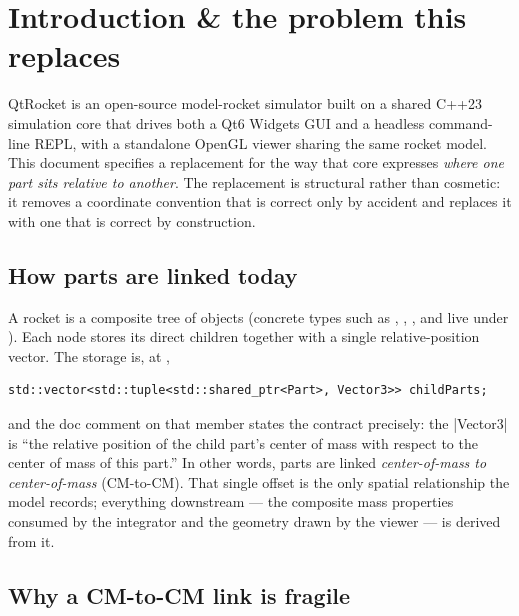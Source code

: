 \section{Introduction \& the problem this replaces}\label{sec:intro}

QtRocket is an open-source model-rocket simulator built on a shared C++23 simulation core that
drives both a Qt6 Widgets GUI and a headless command-line REPL, with a standalone OpenGL viewer
sharing the same rocket model. This document specifies a replacement for the way that core
expresses \emph{where one part sits relative to another}. The replacement is structural rather
than cosmetic: it removes a coordinate convention that is correct only by accident and replaces it
with one that is correct by construction.

\subsection{How parts are linked today}

A rocket is a composite tree of  objects (concrete types such as ,
, , and  live under ). Each node
stores its direct children together with a single relative-position vector. The storage is, at
,

\begin{verbatim}
std::vector<std::tuple<std::shared_ptr<Part>, Vector3>> childParts;
\end{verbatim}

\noindent and the doc comment on that member states the contract precisely: the \cppinline|Vector3|
is ``the relative position of the child part's center of mass with respect to the center of mass of
this part.'' In other words, parts are linked \emph{center-of-mass to center-of-mass} (CM-to-CM).
That single offset is the only spatial relationship the model records; everything downstream --- the
composite mass properties consumed by the integrator and the geometry drawn by the viewer --- is
derived from it.


\subsection{Why a CM-to-CM link is fragile}

